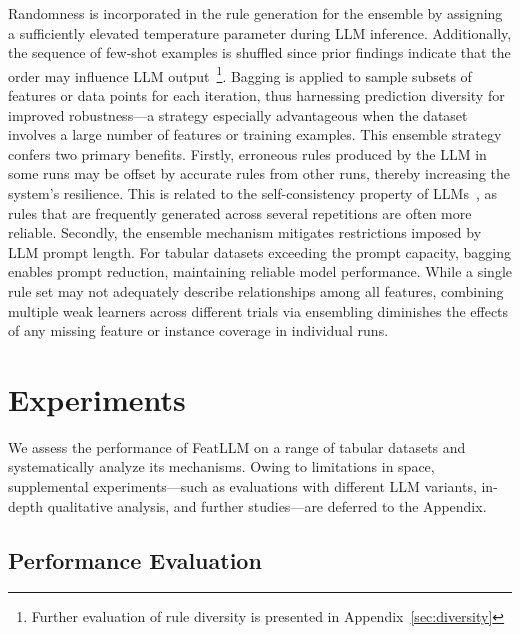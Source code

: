 Randomness is incorporated in the rule generation for the ensemble by assigning a sufficiently elevated temperature parameter during LLM inference. Additionally, the sequence of few-shot examples is shuffled since prior findings indicate that the order may influence LLM output~\cite{lu2022fantastically}\footnote{Further evaluation of rule diversity is presented in Appendix~\ref{sec:diversity}}. Bagging is applied to sample subsets of features or data points for each iteration, thus harnessing prediction diversity for improved robustness—a strategy especially advantageous when the dataset involves a large number of features or training examples. This ensemble strategy confers two primary benefits. Firstly, erroneous rules produced by the LLM in some runs may be offset by accurate rules from other runs, thereby increasing the system’s resilience. This is related to the self-consistency property of LLMs~\cite{wang2022self}, as rules that are frequently generated across several repetitions are often more reliable. Secondly, the ensemble mechanism mitigates restrictions imposed by LLM prompt length. For tabular datasets exceeding the prompt capacity, bagging enables prompt reduction, maintaining reliable model performance. While a single rule set may not adequately describe relationships among all features, combining multiple weak learners across different trials via ensembling diminishes the effects of any missing feature or instance coverage in individual runs.

\section{Experiments}
We assess the performance of \textsf{FeatLLM} on a range of tabular datasets and systematically analyze its mechanisms. Owing to limitations in space, supplemental experiments—such as evaluations with different LLM variants, in-depth qualitative analysis, and further studies—are deferred to the Appendix.

\subsection{Performance Evaluation}
